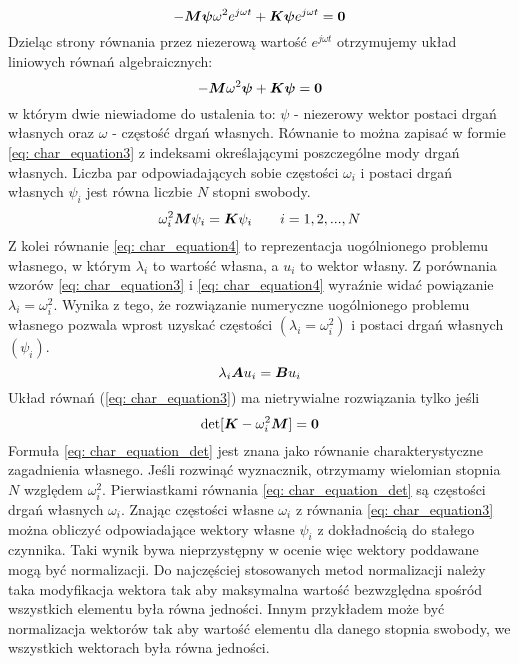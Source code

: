 \begin{equation} \label{eq: char_equation1}
-\bm{M}\bm{\psi}\omega^2 e^{j\omega t} +\bm{K\psi}e^{j\omega t} = \bm{0}
\end{equation}
Dzieląc strony równania przez niezerową wartość $e^{j\omega t}$ otrzymujemy układ liniowych równań algebraicznych:
\begin{equation} \label{eq: char_equation2}
-\bm{M}\omega^2 \bm{\psi} +\bm{K\psi} = \bm{0}
\end{equation}
w którym dwie niewiadome do ustalenia to: $\psi$ - niezerowy wektor postaci drgań własnych oraz $\omega$ - częstość drgań własnych. Równanie to można zapisać w formie \ref{eq: char_equation3} z indeksami określającymi poszczególne mody drgań własnych. Liczba par odpowiadających sobie częstości $\omega_i$ i postaci drgań własnych $\psi_i$ jest równa liczbie $N$ stopni swobody. 
\begin{equation} \label{eq: char_equation3}
\omega^2_i \bm{M}\psi_i = \bm{K}\psi_i\qquad i=1,2,...,N
\end{equation}
Z kolei równanie \ref{eq: char_equation4} to reprezentacja uogólnionego problemu własnego, w którym $\lambda_i$ to wartość własna, a $u_i$ to wektor własny. Z porównania wzorów \ref{eq: char_equation3} i \ref{eq: char_equation4} wyraźnie widać powiązanie $\lambda_i=\omega^2_i$. Wynika z tego, że rozwiązanie numeryczne uogólnionego problemu własnego pozwala wprost uzyskać częstości $(\lambda_i=\omega^2_i)$ i postaci drgań własnych $(\psi_i)$. 
\begin{equation} \label{eq: char_equation4}
\lambda_i \bm{A}u_i = \bm{B}u_i
\end{equation}
Układ równań (\ref{eq: char_equation3}) ma nietrywialne rozwiązania tylko jeśli
\begin{equation} \label{eq: char_equation_det}
\det[\bm{K}-\omega^2_i \bm{M}] = \bm{0}
\end{equation}
Formuła \ref{eq: char_equation_det} jest znana jako równanie charakterystyczne zagadnienia własnego. Jeśli rozwinąć wyznacznik, otrzymamy wielomian stopnia $N$ względem $\omega^2_i$. Pierwiastkami równania \ref{eq: char_equation_det} są częstości drgań własnych $\omega_i$. Znając częstości własne $\omega_i$ z równania \ref{eq: char_equation3} można obliczyć odpowiadające wektory własne $\psi_i$ z dokładnością do stałego czynnika. Taki wynik bywa nieprzystępny w ocenie więc wektory poddawane mogą być normalizacji. Do najczęściej stosowanych metod normalizacji należy taka modyfikacja wektora tak aby maksymalna wartość bezwzględna spośród wszystkich elementu była równa jedności. Innym przykładem może być normalizacja wektorów tak aby wartość elementu dla danego stopnia swobody, we wszystkich wektorach była równa jedności.

